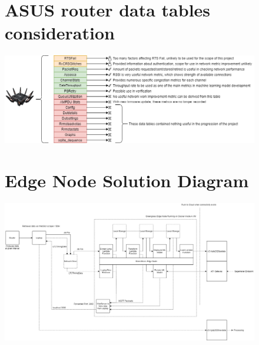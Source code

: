 \begin{landscape}
\begin{figure}[ht]
\begin{minipage}{\linewidth}
\section{ASUS router data tables consideration}

   \centering
    \includegraphics[width=0.99\linewidth]{pages/Chapter3/Chapter 3 images/router_data-Datasets-Usefulness.png}
    
    \label{appendix:ASUS router datatable}

\end{minipage}
\end{figure}
    \end{landscape}
    
\begin{landscape}
\begin{figure}[ht]
\begin{minipage}{\linewidth}
\section{Edge Node Solution Diagram}

   \centering
    \includegraphics[width=1\linewidth]{pages/Chapter3/Chapter 3 images/greengrass_data_flow.png}
    
    \label{appendix:greengrass_design}

\end{minipage}
\end{figure}
    \end{landscape}
    
